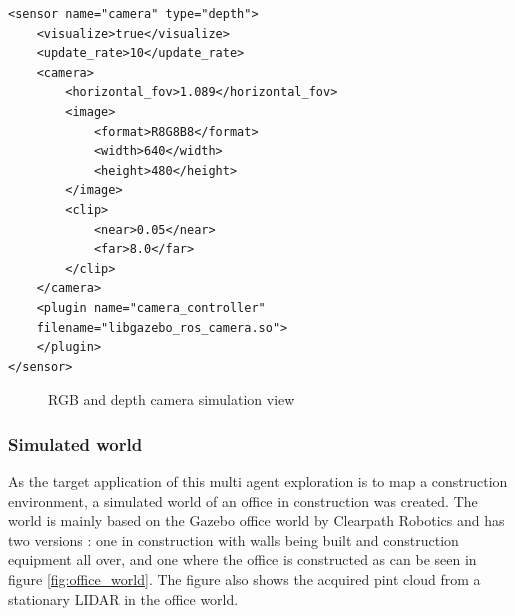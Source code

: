 \documentclass[12pt]{article}
\begin{document}
\vspace{10pt }
\begin{minipage}{0.9\textwidth}      
\begin{lstlisting}[style=xmlStyle, caption={Depth Camera Sensor Configuration}, label={lst:depth_camera_sensor}]
<sensor name="camera" type="depth">
    <visualize>true</visualize>
    <update_rate>10</update_rate>
    <camera>
        <horizontal_fov>1.089</horizontal_fov>
        <image>
            <format>R8G8B8</format>
            <width>640</width>
            <height>480</height>
        </image>
        <clip>
            <near>0.05</near>
            <far>8.0</far>
        </clip>
    </camera>
    <plugin name="camera_controller" 
    filename="libgazebo_ros_camera.so">
    </plugin>
</sensor>
\end{lstlisting}
\end{minipage}

\begin{figure}[H]
    \centering
    \caption{RGB and depth camera simulation view}
    \label{fig:cameras_simulation_view}
\end{figure}

    \subsubsection{Simulated world}

    As the target application of this multi agent exploration is to map a construction environment, a simulated world of an office in construction was created. The world is mainly based on the Gazebo office world by Clearpath Robotics and has two versions : one in construction with walls being built and construction equipment all over, and one where the office is constructed as can be seen in figure \ref{fig:office_world}. The figure also shows the acquired pint cloud from a stationary LIDAR in the office world. 
\end{document}
